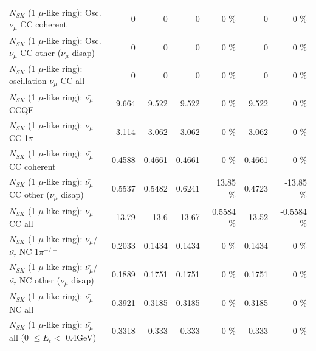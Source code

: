 \begin{table}
\begin{tabular}{| l | r | r | r  r | r  r |}
                        $N_{SK}$ (1 $\mu$-like ring): Osc. $\nu_\mu$ CC coherent &               0 &               0 &               0 &        0 \%  &               0 &        0 \%  \\ 
         $N_{SK}$ (1 $\mu$-like ring): Osc. $\nu_\mu$ CC other ($\nu_\mu$ disap) &               0 &               0 &               0 &        0 \%  &               0 &        0 \%  \\ 
                      $N_{SK}$ (1 $\mu$-like ring): oscillation $\nu_\mu$ CC all &               0 &               0 &               0 &        0 \%  &               0 &        0 \%  \\ 
\hline
\hline
                              $N_{SK}$ (1 $\mu$-like ring): $\bar{\nu_\mu}$ CCQE &           9.664 &           9.522 &           9.522 &        0 \%  &           9.522 &        0 \%  \\ 
                         $N_{SK}$ (1 $\mu$-like ring): $\bar{\nu_\mu}$ CC 1$\pi$ &           3.114 &           3.062 &           3.062 &        0 \%  &           3.062 &        0 \%  \\ 
                       $N_{SK}$ (1 $\mu$-like ring): $\bar{\nu_\mu}$ CC coherent &          0.4588 &          0.4661 &          0.4661 &        0 \%  &          0.4661 &        0 \%  \\ 
        $N_{SK}$ (1 $\mu$-like ring): $\bar{\nu_\mu}$ CC other ($\nu_\mu$ disap) &          0.5537 &          0.5482 &          0.6241 &    13.85 \%  &          0.4723 &   -13.85 \%  \\ 
                          $N_{SK}$ (1 $\mu$-like ring): $\bar{\nu_{\mu}}$ CC all &           13.79 &            13.6 &           13.67 &   0.5584 \%  &           13.52 &  -0.5584 \%  \\ 
\hline
  $N_{SK}$ (1 $\mu$-like ring): $\bar{\nu_\mu}$/$\bar{\nu_\tau}$ NC 1$\pi^{+/-}$ &          0.2033 &          0.1434 &          0.1434 &        0 \%  &          0.1434 &        0 \%  \\ 
$N_{SK}$ (1 $\mu$-like ring): $\bar{\nu_\mu}$/$\bar{\nu_\tau}$ NC other ($\nu_\mu$ disap) &          0.1889 &          0.1751 &          0.1751 &        0 \%  &          0.1751 &        0 \%  \\ 
                          $N_{SK}$ (1 $\mu$-like ring): $\bar{\nu_{\mu}}$ NC all &          0.3921 &          0.3185 &          0.3185 &        0 \%  &          0.3185 &        0 \%  \\ 
\hline
   $N_{SK}$ (1 $\mu$-like ring): $\bar{\nu_{\mu}}$ all (0 $\leq E_{t} <$ 0.4GeV) &          0.3318 &           0.333 &           0.333 &        0 \%  &           0.333 &        0 \%  \\ 

\end{tabular}
\end{table}
